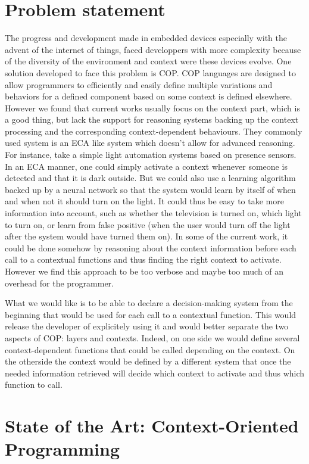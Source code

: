 \documentclass[a4paper]{article}
\begin{document}
\section{Problem statement}
\label{section:problemstatement}
The progress and development made in embedded devices especially with the advent of the internet of things, faced developpers with more complexity because of the diversity of the environment and context were  these devices evolve. One solution developed to face this problem is COP. COP languages are designed to allow programmers to efficiently and easily define multiple variations and behaviors for a defined component based on some context is defined elsewhere.
However we found that current works usually focus on the context part, which is a good thing, but lack the support for reasoning systems backing up the context processing and the corresponding context-dependent behaviours. They commonly used system is an ECA like system which doesn't allow for advanced reasoning.
For instance, take a simple light automation systems based on presence sensors. In an ECA manner, one could simply activate a context whenever someone is detected and that it is dark outside. But we could also use a learning algorithm backed up by a neural network so that the system would learn by itself of when and when not it should turn on the light. It could thus be easy to take more information into account, such as whether the television is turned on, which light to turn on, or learn from false positive (when the user would turn off the light after the system would have turned them on).
In some of the current work, it could be done somehow by reasoning about the context information before each call to a contextual functions and thus finding the right context to activate. However we find this approach to be too verbose and maybe too much of an overhead for the programmer.

What we would like is to be able to declare a decision-making system from the beginning that would be used for each call to a contextual function. This would release the developer of explicitely using it and would better separate the two aspects of COP: layers and contexts. Indeed, on one side we would define several context-dependent functions that could be called depending on the context. On the otherside the context would be defined by a different system that once the needed information retrieved will decide which context to activate and thus which function to call.

\section{State of the Art: Context-Oriented Programming}
\label{section:stateoftheart}
\end{document}
